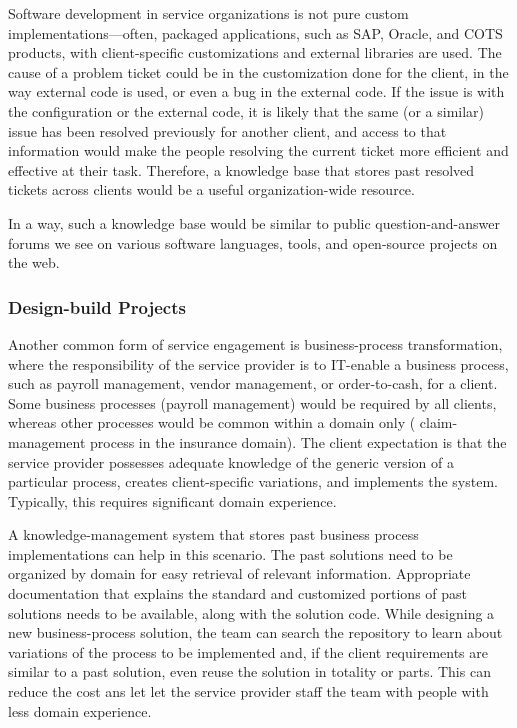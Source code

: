Software development in service organizations is not pure custom
implementations---often, packaged applications, such as SAP, Oracle, and COTS
products, with client-specific customizations and external libraries are
used. The cause of a problem ticket could be in the customization done for the
client, in the way external code is used, or even a bug in the external code. If
the issue is with the configuration or the external code, it is likely that the
same (or a similar) issue has been resolved previously for another client, and
access to that information would make the people resolving the current ticket
more efficient and effective at their task.  Therefore, a knowledge base that
stores past resolved tickets across clients would be a useful organization-wide
resource.

In a way, such a knowledge base would be similar to public question-and-answer
forums we see on various software languages, tools, and open-source projects on
the web.

\subsubsection{Design-build Projects}

Another common form of service engagement is business-process transformation,
where the responsibility of the service provider is to IT-enable a business
process, such as payroll management, vendor management, or order-to-cash, for a
client. Some business processes (\eg payroll management) would be required by
all clients, whereas other processes would be common within a domain only (\eg
claim-management process in the insurance domain).  The client expectation is
that the service provider possesses adequate knowledge of the generic version of
a particular process, creates client-specific variations, and implements the
system. Typically, this requires significant domain experience.

A knowledge-management system that stores past business process implementations
can help in this scenario. The past solutions need to be organized by domain for
easy retrieval of relevant information. Appropriate documentation that explains
the standard and customized portions of past solutions needs to be available,
along with the solution code. While designing a new business-process solution,
the team can search the repository to learn about variations of the process to
be implemented and, if the client requirements are similar to a past solution,
even reuse the solution in totality or parts. This can reduce the cost ans let
let the service provider staff the team with people with less domain experience.

